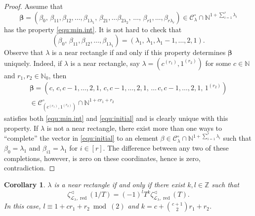 \documentclass[11pt]{amsart}
\numberwithin{equation}{section}
\numberwithin{figure}{section}
\theoremstyle{plain}
\newtheorem{corollary}[theorem]{Corollary}
\theoremstyle{definition}
\theoremstyle{remark}
\begin{document}
\begin{proof}
  Assume that $${\boldsymbol{\beta}} = (\beta_0,\,
  \beta_{11},\beta_{12},\dots,\beta_{1\lambda_1},\,\beta_{21}, \dots
  \beta_{2\lambda_2},\,\dots,\,\beta_{r1},\dots,\beta_{r\lambda_r})
  \in {{\mathcal{C}}}_{\lambda}^{\circ} \cap {\ensuremath{\mathbb{N}}}^{1+\sum_{i=1}^r\lambda_i}$$ has
  the property \eqref{equ:min.int}. It is not hard to check that
\begin{equation}\label{equ:initial}
  (\beta_0,\, \beta_{11},\beta_{12},\dots,\beta_{1\lambda_1}) =
  (\lambda_1,\, \lambda_1, \lambda_1-1,\dots,2,1).
\end{equation}
Observe that $\lambda$ is a near rectangle if and only if this
property determines ${\boldsymbol{\beta}}$ uniquely. Indeed, if $\lambda$ is a near
rectangle, say $\lambda=(c^{(r_1)},1^{(r_2)})$ for some $c\in{\ensuremath{\mathbb{N}}}$ and
$r_1,r_2\in{\ensuremath{\mathbb{N}}}_0$, then
\begin{multline*}
  {\boldsymbol{\beta}} = (c,\, c, c-1,\dots,2,1,\,c, c-1,\dots,2,1,\, \dots \, c,
  c-1,\dots,2,1,\, 1^{(r_2)})\\ \in
  {{\mathcal{C}}}_{(c^{(r_1)},1^{(r_2)})}^{\circ} \cap {\ensuremath{\mathbb{N}}}^{1+cr_1+r_2}
\end{multline*}
 satisfies both \eqref{equ:min.int} and \eqref{equ:initial} and is
 clearly unique with this property. If $\lambda$ is not a near
 rectangle, there exist more than one ways to ``complete'' the vector
 in \eqref{equ:initial} to an element $\beta \in
 {{\mathcal{C}}}_{\lambda}^{\circ} \cap {\ensuremath{\mathbb{N}}}^{1+\sum_{i=1}^r\lambda_i}$ such that
 $\beta_0=\lambda_1$ and $\beta_{i1}=\lambda_1$ for $i\in[r]$. The
 difference between any two of these completions, however, is zero on
 these coordinates, hence is zero, contradiction.
\end{proof}

\begin{corollary}\label{cor:char.funeq.red}
  $\lambda$ is a near rectangle if and only if there exist $k,l\in{\ensuremath{\mathbb{Z}}}$
  such that
\begin{equation}\label{equ:funeq.red}
 \left. \zeta^{\triangleleft}_{{\ensuremath{\mathcal{L}}}_\lambda,\operatorname{red}}(1/T)\right. = (-1)^lT^k
 \zeta^{\triangleleft}_{{\ensuremath{\mathcal{L}}}_\lambda,\operatorname{red}}(T).
\end{equation}
In this case, $l \equiv 1 + c r_1+r_2\bmod(2)$ and $k =
c+\binom{c+1}{2}r_1+r_2$.
\end{corollary}
\end{document}

